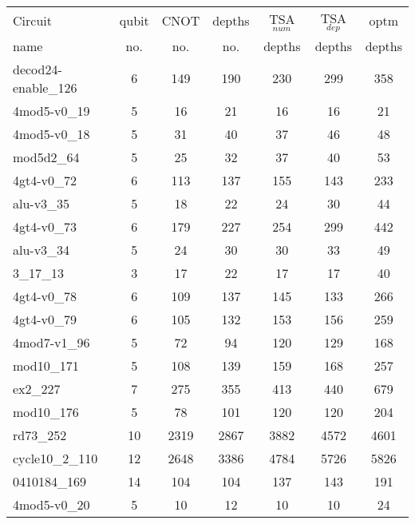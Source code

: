 \documentclass[journal]{IEEEtran}
\begin{document}
\begin{table*}[htbp]
    \begin{center}  
        \begin{tabular}{|p{4.3cm}<{\centering}|c|c|c|c|c|c|}
            \hline
                        Circuit &  qubit  & CNOT &depths &TSA$_{num}$& TSA$_{dep}$  & optm 	  	\\
                         name	&   no. 	&	no. & no. & depths&  depths &  depths 	\\
                        \hline
                        decod24-enable\_126 & 6 & 149 & 190 & 230 & 299 & 358 \\ 
                        4mod5-v0\_19 & 5 & 16 & 21 & 16 & 16 & 21 \\ 
                        4mod5-v0\_18 & 5 & 31 & 40 & 37 & 46 & 48 \\ 
                        mod5d2\_64 & 5 & 25 & 32 & 37 & 40 & 53 \\ 
                        4gt4-v0\_72 & 6 & 113 & 137 & 155 & 143 & 233 \\ 
                        alu-v3\_35 & 5 & 18 & 22 & 24 & 30 & 44 \\ 
                        4gt4-v0\_73 & 6 & 179 & 227 & 254 & 299 & 442 \\ 
                        alu-v3\_34 & 5 & 24 & 30 & 30 & 33 & 49 \\ 
                        3\_17\_13 & 3 & 17 & 22 & 17 & 17 & 40 \\ 
                        4gt4-v0\_78 & 6 & 109 & 137 & 145 & 133 & 266 \\ 
                        4gt4-v0\_79 & 6 & 105 & 132 & 153 & 156 & 259 \\ 
                        4mod7-v1\_96 & 5 & 72 & 94 & 120 & 129 & 168 \\ 
                        mod10\_171 & 5 & 108 & 139 & 159 & 168 & 257 \\ 
                        ex2\_227 & 7 & 275 & 355 & 413 & 440 & 679 \\ 
                        mod10\_176 & 5 & 78 & 101 & 120 & 120 & 204 \\ 
                        rd73\_252 & 10 & 2319 & 2867 & 3882 & 4572 & 4601 \\ 
                        cycle10\_2\_110 & 12 & 2648 & 3386 & 4784 & 5726 & 5826 \\ 
                        0410184\_169 & 14 & 104 & 104 & 137 & 143 & 191 \\ 
                        4mod5-v0\_20 & 5 & 10 & 12 & 10 & 10 & 24 \\ 

\end{tabular}
\end{center}
\end{table*}
\end{document}
